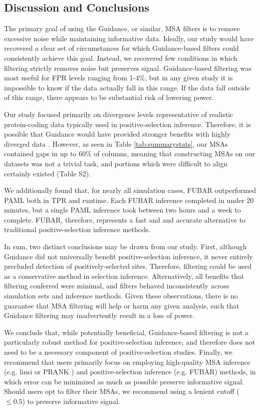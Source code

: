 \documentclass[11pt]{article}
\begin{document}
\subsection*{Discussion and Conclusions}

The primary goal of using the Guidance, or similar, MSA filters is to remove excessive noise while maintaining informative data. Ideally, our study would have recovered a clear set of circumstances for which Guidance-based filters could consistently achieve this goal. Instead, we recovered few conditions in which filtering strictly removes noise but preserves signal. Guidance-based filtering was most useful for FPR levels ranging from 1-4\%, but in any given study it is impossible to know if the data actually fall in this range. If the data fall outside of this range, there appears to be substantial risk of lowering power.

Our study focused primarily on divergence levels representative of realistic protein-coding data typically used in positive-selection inference. Therefore, it is possible that Guidance would have provided stronger benefits with highly diverged data \cite{Privman2012}.
However, as seen in Table \ref{tab:summarystats}, our MSAs contained gaps in up to 60\% of columns, meaning that constructing MSAs on our datasets was not a trivial task, and portions which were difficult to align certainly existed (Table S2).

We additionally found that, for nearly all simulation cases, FUBAR outperformed PAML both in TPR and runtime. Each FUBAR inference completed in under 20 minutes, but a single PAML inference took between two hours and a week to complete. FUBAR, therefore, represents a fast and and accurate alternative to traditional positive-selection inference methods. %

In sum, two distinct conclusions may be drawn from our study. First, although Guidance did not universally benefit positive-selection inference, it never entirely precluded detection of positively-selected sites. Therefore, filtering could be used as a conservative method in selection inference. Alternatively, all benefits that filtering conferred were minimal, and filters behaved inconsistently across simulation sets and inference methods. Given these observations, there is no guarantee that MSA filtering will help or harm any given analysis, such that Guidance filtering may inadvertently result in a loss of power. 

We conclude that, while potentially beneficial, Guidance-based filtering is not a particularly robust method for positive-selection inference, and therefore does not need to be a necessary component of positive-selection studies. Finally, we recommend that users primarily focus on employing high-quality MSA inference (e.g. linsi \citep{Katoh2005} or PRANK \citep{Loytynoja2008}) and positive-selection inference (e.g. FUBAR) methods, in which error can be minimized as much as possible preserve informative signal. Should users opt to filter their MSAs, we recommend using a lenient cutoff ($\leq0.5$) to preserve informative signal.
\end{document}
